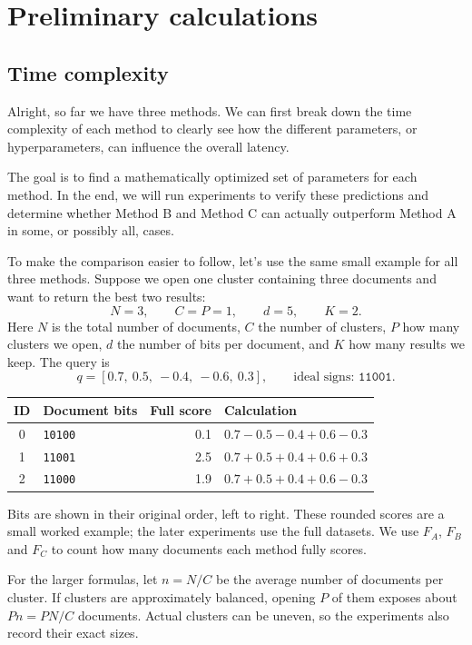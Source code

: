 \section{Preliminary calculations}
\subsection{Time complexity}
Alright, so far we have three methods. We can first break down the time complexity of each method to clearly see how the different parameters, or hyperparameters, can influence the overall latency.

The goal is to find a mathematically optimized set of parameters for each method. In the end, we will run experiments to verify these predictions and determine whether Method B and Method C can actually outperform Method A in some, or possibly all, cases.

To make the comparison easier to follow, let's use the same small example for all three methods. Suppose we open one cluster containing three documents and want to return the best two results:
\[
 N=3,\qquad C=P=1,\qquad d=5,\qquad K=2.
\]
Here $N$ is the total number of documents, $C$ the number of clusters, $P$ how many clusters we open, $d$ the number of bits per document, and $K$ how many results we keep. The query is
\[
 q=[0.7,\ 0.5,\ -0.4,\ -0.6,\ 0.3],\qquad
 \text{ideal signs: }\texttt{11001}.
\]
\begin{center}
\begin{tabular}{@{}clrl@{}}\toprule
ID & Document bits & Full score & Calculation\\\midrule
0 & \texttt{10100} & 0.1 & $0.7-0.5-0.4+0.6-0.3$\\
1 & \texttt{11001} & 2.5 & $0.7+0.5+0.4+0.6+0.3$\\
2 & \texttt{11000} & 1.9 & $0.7+0.5+0.4+0.6-0.3$\\\bottomrule
\end{tabular}
\end{center}
Bits are shown in their original order, left to right. These rounded scores are a small worked example; the later experiments use the full datasets. We use $F_A$, $F_B$ and $F_C$ to count how many documents each method fully scores.

For the larger formulas, let $n=N/C$ be the average number of documents per cluster. If clusters are approximately balanced, opening $P$ of them exposes about $Pn=PN/C$ documents. Actual clusters can be uneven, so the experiments also record their exact sizes.

